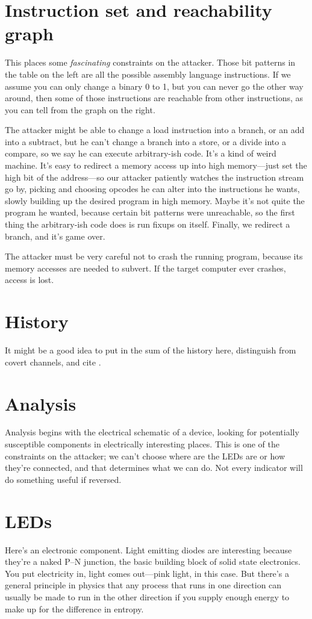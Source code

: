 \documentclass[letterpaper]{article}
\begin{document}
\section{Instruction set and reachability graph}
This places some \emph{fascinating} constraints on the attacker. Those bit
patterns in the table on the left are all the possible assembly language
instructions. If we assume you can only change a binary 0 to 1, but you can
never go the other way around, then some of those instructions are reachable
from other instructions, as you can tell from the graph on the right.

The attacker might be able to change a load instruction into a branch, or an
add into a subtract, but he can't change a branch into a store, or a divide
into a compare, so we say he can execute arbitrary-ish code. It's a kind of
weird machine. It's easy to redirect a memory access up into high memory---just
set the high bit of the address---so our attacker patiently watches the
instruction stream go by, picking and choosing opcodes he can alter into the
instructions he wants, slowly building up the desired program in high memory.
Maybe it's not quite the program he wanted, because certain bit patterns were
unreachable, so the first thing the arbitrary-ish code does is run fixups on
itself. Finally, we redirect a branch, and it's game over.

The attacker must be very careful not to crash the running program, because its
memory accesses are needed to subvert. If the target computer ever crashes,
access is lost.
\section{History}
It might be a good idea to put in the sum of the history here, distinguish from
covert channels, and cite \cite{Kuhnapfel2021b}.
\section{Analysis}
Analysis begins with the electrical schematic of a device, looking for
potentially susceptible components in electrically interesting places. This is
one of the constraints on the attacker; we can't choose where are the LEDs are
or how they're connected, and that determines what we can do. Not every
indicator will do something useful if reversed.
\section{LEDs}
Here's an electronic component. Light emitting diodes are interesting because
they're a naked P--N junction, the basic building block of solid state
electronics. You put electricity in, light comes out---pink light, in this
case. But there's a general principle in physics that any process that runs in
one direction can usually be made to run in the other direction if you supply
enough energy to make up for the difference in entropy.
\end{document}
